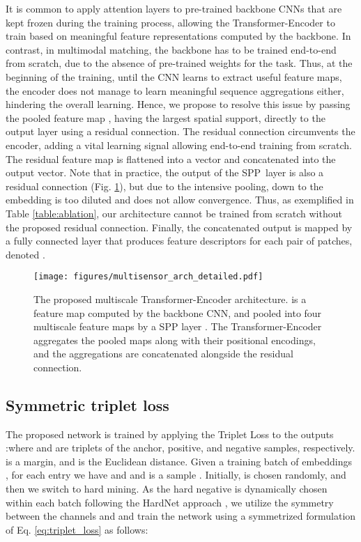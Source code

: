 \documentclass[10pt,journal]{IEEEtran}\usepackage{amsfonts}
\begin{document}
It is common to apply attention layers to pre-trained backbone CNNs that are
kept frozen during the training process, allowing the Transformer-Encoder to
train based on meaningful feature representations computed by the backbone.
In contrast, in multimodal matching, the backbone has to be trained
end-to-end from scratch, due to the absence of pre-trained weights for the
task. Thus, at the beginning of the training, until the CNN learns to
extract useful feature maps, the encoder does not manage to learn meaningful
sequence aggregations either, hindering the overall learning. Hence, we
propose to resolve this issue by passing the pooled feature map , having the largest spatial support,
directly to the output layer using a residual connection. The residual
connection circumvents the encoder, adding a vital learning signal allowing
end-to-end training from scratch. The residual feature map is flattened into
a vector  and concatenated into
the output vector. Note that in practice, the output of the SPP\ layer   is also a residual connection (Fig. \ref {fig:arch_detailed}), but due to the intensive pooling, down to 
the embedding is too diluted and does not allow convergence. Thus, as
exemplified in Table \ref{table:ablation}, our architecture cannot be
trained from scratch without the proposed residual connection. Finally, the
concatenated output is mapped by a fully connected layer  that produces
feature descriptors for each pair of patches, denoted .
\begin{figure}[t]
\caption{The proposed multiscale Transformer-Encoder architecture.  is a feature map computed by the backbone CNN, and
pooled into four multiscale feature maps  by a
SPP layer \protect\cite{SPP}. The Transformer-Encoder aggregates the pooled
maps  along with their positional encodings, and
the aggregations  are concatenated alongside the residual connection.}
\label{fig:arch_detailed}\centering\texttt{[image: figures/multisensor\_arch\_detailed.pdf]}
\end{figure}

\subsection{Symmetric triplet loss}

\label{subsec:symmetric triplett}

The proposed network is trained by applying the Triplet Loss \cite {FaceNetTripletLoss} to the outputs :where  and  are triplets of the anchor, positive, and
negative samples, respectively.  is a margin, and  is the Euclidean
distance. Given a training batch of  embeddings , for each entry  we have   and  and
is a sample . Initially,  is chosen
randomly, and then we switch to hard mining. As the hard negative  is
dynamically chosen within each batch following the HardNet approach \cite {HardNet}, we utilize the symmetry between the channels  and  and train the network using a
symmetrized formulation of Eq. \ref{eq:triplet_loss} as follows:
\end{document}
